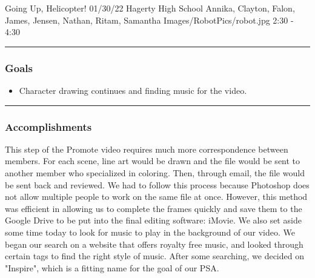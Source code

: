\insertmeeting 
	{Going Up, Helicopter!} 
	{01/30/22} 
	{Hagerty High School}
	{Annika, Clayton, Falon, James, Jensen, Nathan, Ritam, Samantha}
	{Images/RobotPics/robot.jpg}
	{2:30 - 4:30}
	
\noindent\hfil\rule{\textwidth}{.4pt}\hfil
\subsubsection*{Goals}
\begin{itemize}
    \item Character drawing continues and finding music for the video.

\end{itemize} 

\noindent\hfil\rule{\textwidth}{.4pt}\hfil

\subsubsection*{Accomplishments}
This step of the Promote video requires much more correspondence between members. For each scene, line art would be drawn and the file would be sent to another member who specialized in coloring. Then, through email, the file would be sent back and reviewed. We had to follow this process because Photoshop does not allow multiple people to work on the same file at once. However, this method was efficient in allowing us to complete the frames quickly and save them to the Google Drive to be put into the final editing software: iMovie. We also set aside some time today to look for music to play in the background of our video. We began our search on a website that offers royalty free music, and looked through certain tags to find the right style of music. After some searching, we decided on "Inspire", which is a fitting name for the goal of our PSA. 
 

